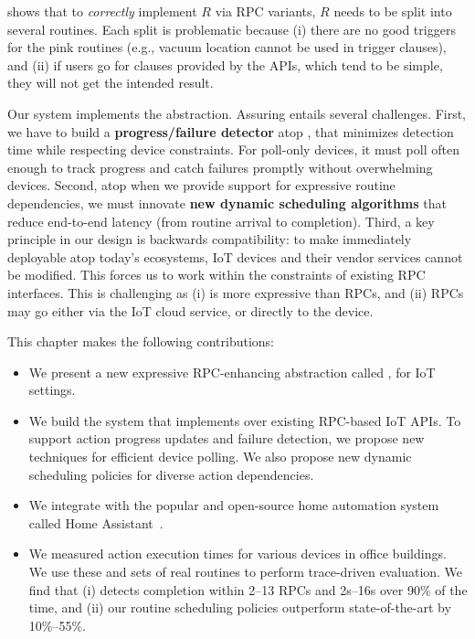  shows that to {\it correctly} implement $R$ via RPC variants, $R$ needs to be split into several routines. 
Each split is problematic because (i) there are no good triggers for the pink routines (e.g., vacuum location cannot be used in trigger clauses), and (ii) if users go for clauses provided by the APIs, which tend to be simple, they will not get the intended result. 

Our system \sysname{} implements the \abstraction{} abstraction. 
Assuring  entails several challenges. 
First, we have to build a {\bf progress/failure detector} atop \abs, that minimizes detection time while respecting device constraints.
For poll-only devices,
it must poll often enough to track progress and catch failures promptly without overwhelming devices.
Second, atop \abs{} when we provide support for expressive routine dependencies, we must innovate {\bf new dynamic scheduling algorithms} that reduce end-to-end latency (from routine arrival to completion).
Third, a key principle in our design is backwards compatibility: to make \sysname{} immediately deployable atop today's ecosystems, IoT devices and their vendor services cannot be modified. This forces us to work within the constraints of existing RPC interfaces. 
This is challenging as (i) \abs{} is more expressive than RPCs, and (ii) RPCs may go either via the IoT cloud service, or directly to the device.

This chapter makes the following contributions:
\begin{itemize}
\item We present a new expressive RPC-enhancing abstraction called \abs, for IoT settings.
\item We build the \sysname{} system that implements \abs{} over existing RPC-based IoT APIs.
To support action progress updates and failure detection, we propose new techniques for efficient device polling. We also propose new dynamic scheduling policies for 
diverse action dependencies.
\item We integrate \sysname{}
with the popular and open-source home automation system called Home Assistant~\cite{HomeAssistant}.
\item We measured action execution times for various devices in office buildings. 
We use these and sets of real routines to perform trace-driven evaluation. We find that (i) \sysname{} 
detects completion within 2--13 RPCs and 2s--16s over 90\% of the time, and (ii) 
our routine scheduling policies outperform state-of-the-art by 10\%--55\%.

\end{itemize}
